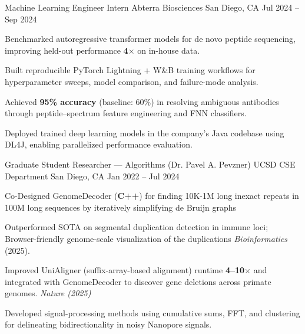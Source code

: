 \documentclass[11pt, a4paper]{awesome-cv}
\begin{document}
\begin{cventries}
  \cventry
    {Machine Learning Engineer Intern}
    {Abterra Biosciences}
    {San Diego, CA}
    {Jul 2024 -- Sep 2024}
    {
      \begin{cvitems}
        \item {Benchmarked autoregressive transformer models for de novo peptide sequencing, improving held-out performance \textbf{4$\times$} on in-house data.}
        \item {Built reproducible PyTorch Lightning + W\&B training workflows for hyperparameter sweeps, model comparison, and failure-mode analysis.}
        \item {Achieved \textbf{95\% accuracy} (baseline: 60\%) in resolving ambiguous antibodies through peptide–spectrum feature engineering and FNN classifiers.}
        \item {Deployed trained deep learning models in the company's Java codebase using DL4J, enabling parallelized performance evaluation.}
      \end{cvitems}
    }
    
  \cventry
    {Graduate Student Researcher — Algorithms (Dr. Pavel A. Pevzner)}
    {UCSD CSE Department}
    {San Diego, CA}
    {Jan 2022 -- Jul 2024}
    {
      \begin{cvitems}
        \item {Co-Designed GenomeDecoder (\textbf{C++}) for finding 10K-1M long inexact repeats in 100M long sequences by iteratively simplifying de Bruijn graphs}
        \item {Outperformed SOTA on segmental duplication detection in immune loci; Browser-friendly genome-scale visualization of the duplications \textit{Bioinformatics} (2025).}
        \item {Improved UniAligner (suffix-array-based alignment) runtime \textbf{4--10$\times$} and integrated with GenomeDecoder to discover gene deletions across primate genomes. \textit{Nature (2025)}}
        \item {Developed signal-processing methods using cumulative sums, FFT, and clustering for delineating bidirectionality in noisy Nanopore signals.}
      \end{cvitems}
    }
    

\end{cventries}
\end{document}
